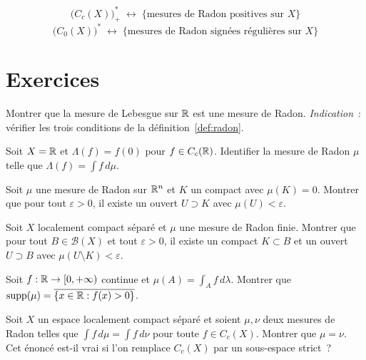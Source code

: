 \begin{formules}[title=\textbf{Correspondance de Riesz}]
\[
\boxed{
    \bigl(C_c(X)\bigr)^*_+ \;\longleftrightarrow\;
    \{\text{mesures de Radon positives sur } X\}
}
\]
\[
\boxed{
    \bigl(C_0(X)\bigr)^* \;\longleftrightarrow\;
    \{\text{mesures de Radon sign\'ees r\'eguli\`eres sur } X\}
}
\]
\end{formules}

\section{Exercices}

\begin{exercice}
Montrer que la mesure de Lebesgue sur $\mathbb{R}$ est une mesure de Radon.
\emph{Indication}~: v\'erifier les trois conditions de la d\'efinition~\ref{def:radon}.
\end{exercice}

\begin{exercice}
Soit $X = \mathbb{R}$ et $\Lambda(f) = f(0)$ pour $f \in C_c(\mathbb{R})$. Identifier la mesure
de Radon $\mu$ telle que $\Lambda(f) = \int f\, d\mu$.
\end{exercice}

\begin{exercice}
Soit $\mu$ une mesure de Radon sur $\mathbb{R}^n$ et $K$ un compact avec $\mu(K) = 0$.
Montrer que pour tout $\varepsilon > 0$, il existe un ouvert $U \supset K$
avec $\mu(U) < \varepsilon$.
\end{exercice}

\begin{exercice}
Soit $X$ localement compact s\'epar\'e et $\mu$ une mesure de Radon finie. Montrer
que pour tout $B \in \mathcal{B}(X)$ et tout $\varepsilon > 0$, il existe un compact
$K \subset B$ et un ouvert $U \supset B$ avec $\mu(U \setminus K) < \varepsilon$.
\end{exercice}

\begin{exercice}
Soit $f : \mathbb{R} \to [0, +\infty)$ continue et $\mu(A) = \int_A f\, d\lambda$.
Montrer que $\mathrm{supp}(\mu) = \overline{\{x \in \mathbb{R} : f(x) > 0\}}$.
\end{exercice}

\begin{exercice}
Soit $X$ un espace localement compact s\'epar\'e et soient $\mu, \nu$ deux mesures
de Radon telles que $\int f\, d\mu = \int f\, d\nu$ pour toute $f \in C_c(X)$.
Montrer que $\mu = \nu$. Cet \'enonc\'e est-il vrai si l'on remplace $C_c(X)$ par
un sous-espace strict~?
\end{exercice}
